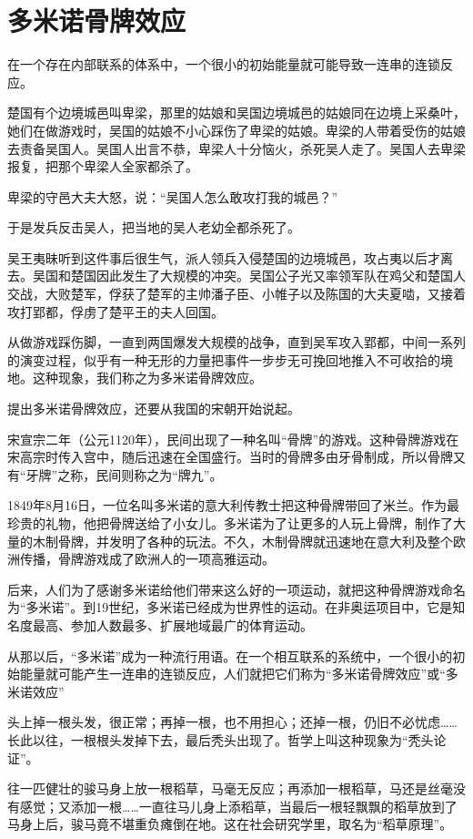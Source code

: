 \documentclass[11pt]{ctexart}
\begin{document}
\section{多米诺骨牌效应}
\label{sec-34}


在一个存在内部联系的体系中，一个很小的初始能量就可能导致一连串的连锁反应。

楚国有个边境城邑叫卑梁，那里的姑娘和吴国边境城邑的姑娘同在边境上采桑叶，她们在做游戏时，吴国的姑娘不小心踩伤了卑梁的姑娘。卑梁的人带着受伤的姑娘去责备吴国人。吴国人出言不恭，卑梁人十分恼火，杀死吴人走了。吴国人去卑梁报复，把那个卑梁人全家都杀了。

卑梁的守邑大夫大怒，说：“吴国人怎么敢攻打我的城邑？”

于是发兵反击吴人，把当地的吴人老幼全都杀死了。

吴王夷昧听到这件事后很生气，派人领兵入侵楚国的边境城邑，攻占夷以后才离去。吴国和楚国因此发生了大规模的冲突。吴国公子光又率领军队在鸡父和楚国人交战，大败楚军，俘获了楚军的主帅潘子臣、小帷子以及陈国的大夫夏啮，又接着攻打郢都，俘虏了楚平王的夫人回国。

从做游戏踩伤脚，一直到两国爆发大规模的战争，直到吴军攻入郢都，中间一系列的演变过程，似乎有一种无形的力量把事件一步步无可挽回地推入不可收拾的境地。这种现象，我们称之为多米诺骨牌效应。

提出多米诺骨牌效应，还要从我国的宋朝开始说起。

宋宣宗二年（公元1120年），民间出现了一种名叫“骨牌”的游戏。这种骨牌游戏在宋高宗时传入宫中，随后迅速在全国盛行。当时的骨牌多由牙骨制成，所以骨牌又有“牙牌”之称，民间则称之为“牌九”。

1849年8月16日，一位名叫多米诺的意大利传教士把这种骨牌带回了米兰。作为最珍贵的礼物，他把骨牌送给了小女儿。多米诺为了让更多的人玩上骨牌，制作了大量的木制骨牌，并发明了各种的玩法。不久，木制骨牌就迅速地在意大利及整个欧洲传播，骨牌游戏成了欧洲人的一项高雅运动。

后来，人们为了感谢多米诺给他们带来这么好的一项运动，就把这种骨牌游戏命名为“多米诺”。到19世纪，多米诺已经成为世界性的运动。在非奥运项目中，它是知名度最高、参加人数最多、扩展地域最广的体育运动。

从那以后，“多米诺”成为一种流行用语。在一个相互联系的系统中，一个很小的初始能量就可能产生一连串的连锁反应，人们就把它们称为“多米诺骨牌效应”或“多米诺效应”

头上掉一根头发，很正常；再掉一根，也不用担心；还掉一根，仍旧不必忧虑……长此以往，一根根头发掉下去，最后秃头出现了。哲学上叫这种现象为“秃头论证”。

往一匹健壮的骏马身上放一根稻草，马毫无反应；再添加一根稻草，马还是丝毫没有感觉；又添加一根……一直往马儿身上添稻草，当最后一根轻飘飘的稻草放到了马身上后，骏马竟不堪重负瘫倒在地。这在社会研究学里，取名为“稻草原理”。
\end{document}
